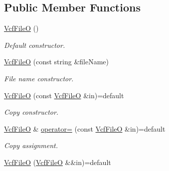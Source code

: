\subsection*{Public Member Functions}
\begin{DoxyCompactItemize}
\item 
\mbox{\label{classvarfiles_1_1_vcf_file_o_a1acb01d3b8b0ef02f05d0aeb89a7b9ba}} 
\hyperlink{classvarfiles_1_1_vcf_file_o_a1acb01d3b8b0ef02f05d0aeb89a7b9ba}{Vcf\+FileO} ()
\begin{DoxyCompactList}\small\item\em Default constructor. \end{DoxyCompactList}\item 
\hyperlink{classvarfiles_1_1_vcf_file_o_a34335e0c031dced944ccccfa361ec161}{Vcf\+FileO} (const string \&file\+Name)
\begin{DoxyCompactList}\small\item\em File name constructor. \end{DoxyCompactList}\item 
\mbox{\label{classvarfiles_1_1_vcf_file_o_a89d45c9fc35d0421f47cdcd489c942a3}} 
\hyperlink{classvarfiles_1_1_vcf_file_o_a89d45c9fc35d0421f47cdcd489c942a3}{Vcf\+FileO} (const \hyperlink{classvarfiles_1_1_vcf_file_o}{Vcf\+FileO} \&in)=default
\begin{DoxyCompactList}\small\item\em Copy constructor. \end{DoxyCompactList}\item 
\mbox{\label{classvarfiles_1_1_vcf_file_o_a883cf25cc3550f4ffdb4de98ce23b669}} 
\hyperlink{classvarfiles_1_1_vcf_file_o}{Vcf\+FileO} \& \hyperlink{classvarfiles_1_1_vcf_file_o_a883cf25cc3550f4ffdb4de98ce23b669}{operator=} (const \hyperlink{classvarfiles_1_1_vcf_file_o}{Vcf\+FileO} \&in)=default
\begin{DoxyCompactList}\small\item\em Copy assignment. \end{DoxyCompactList}\item 
\mbox{\label{classvarfiles_1_1_vcf_file_o_aea889cacad823c90e4630f34b86562a1}} 
\hyperlink{classvarfiles_1_1_vcf_file_o_aea889cacad823c90e4630f34b86562a1}{Vcf\+FileO} (\hyperlink{classvarfiles_1_1_vcf_file_o}{Vcf\+FileO} \&\&in)=default

\end{DoxyCompactItemize}
